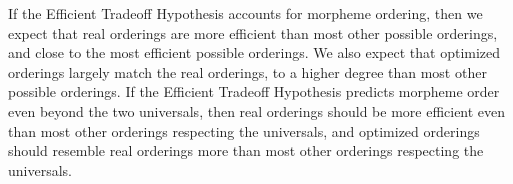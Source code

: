 \documentclass[11pt,letterpaper]{article}
\newcommand\becky[1]{{\color{blue}(#1)}}
\newcommand{\jd}[1]{\textcolor{Pink}{[jd: #1]}}
\begin{document}

If the Efficient Tradeoff Hypothesis accounts for morpheme ordering, then we expect that real orderings are more efficient than most other possible orderings, and close to the most efficient possible orderings.
We also expect that optimized orderings largely match the real orderings, to a higher degree than most other possible orderings.
If the Efficient Tradeoff Hypothesis predicts morpheme order even beyond the two universals, then real orderings should be more efficient even than most other orderings respecting the universals, and optimized orderings should resemble real orderings more than most other orderings respecting the universals.

\end{document}
